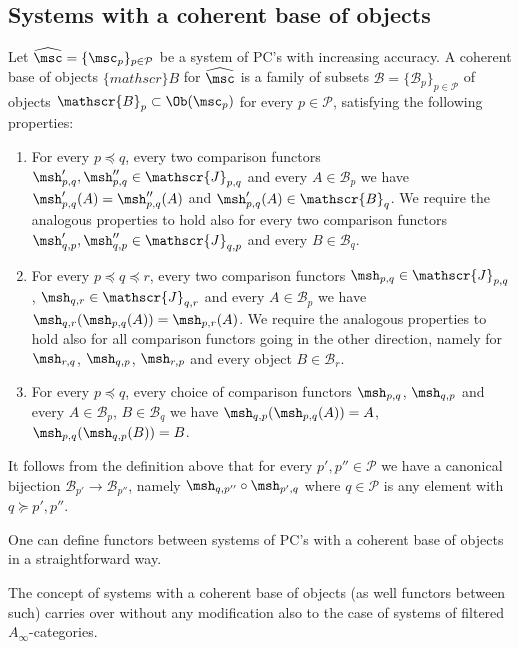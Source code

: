 \subsection{Systems with a coherent base of
  objects} \label{sbsb:sys-base} Let
$\widehat{\msc} = \{\msc_p\}_{p \in \mathcal{P}}$ be a system of PC's
with increasing accuracy. A coherent base of objects $\{mathscr\}{B}$ for
$\widehat{\msc}$ is a family of subsets
  $\mathscr{B} = \{\mathscr{B}_p\}_{p \in \mathcal{P}}$ of objects
  $\mathscr{B}_p \subset \Ob(\msc_p)$ for every $p \in \mathcal{P}$,
satisfying the following properties:
\begin{enumerate}
\item For every $p \preceq q$, every two comparison functors
  $\msh'_{p,q}, \msh''_{p,q} \in \mathscr{J}_{p,q}$ and every
  $A \in \mathscr{B}_p$ we have $\msh'_{p,q}(A) = \msh''_{p,q}(A)$ and
  $\msh'_{p,q}(A) \in \mathscr{B}_q$. We require the analogous
  properties to hold also for every two comparison functors
  $\msh'_{q,p}, \msh''_{q,p} \in \mathscr{J}_{q,p}$ and every
  $B \in \mathscr{B}_q$.
\item For every $p \preceq q \preceq r$, every two comparison functors
  $\msh_{p,q} \in \mathscr{J}_{p,q}$,
  $\msh_{q,r} \in \mathscr{J}_{q,r}$ and every $A \in \mathscr{B}_p$
  we have $\msh_{q,r}(\msh_{p,q}(A)) = \msh_{p,r}(A)$. We require the
  analogous properties to hold also for all comparison functors going
  in the other direction, namely for $\msh_{r,q}$, $\msh_{q,p}$,
  $\msh_{r,p}$ and
  every object $B \in \mathscr{B}_r$.
\item For every $p \preceq q$, every choice of comparison functors
  $\msh_{p,q}$, $\msh_{q,p}$ and every $A \in \mathscr{B}_p$,
  $B \in \mathscr{B}_q$ we have $\msh_{q,p}(\msh_{p,q}(A)) = A$,
  $\msh_{p,q}(\msh_{q,p}(B)) = B$.
\end{enumerate}
It follows from the definition above that for every
$p', p'' \in \mathcal{P}$ we have a canonical bijection
$\mathscr{B}_{p'} \longrightarrow \mathcal{B}_{p''}$, namely
$\msh_{q, p''} \circ \msh_{p', q}$ where $q \in \mathcal{P}$ is any
element with $q \succeq p', p''$.

One can define functors between systems of PC's with a coherent base
of objects in a straightforward way.

The concept of systems with a coherent base of objects (as well
functors between such) carries over without any modification also to
the case of systems of filtered $A_{\infty}$-categories.


